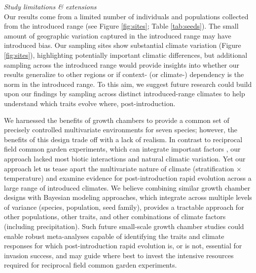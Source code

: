 \documentclass[11pt]{article}\usepackage[]{graphicx}\usepackage[]{color}
\begin{document}
\emph{Study limitations \& extensions}\\ 
Our results come from a limited number of individuals and populations collected from the introduced range (see Figure \ref{fig:sites}; Table \ref{tab:seeds}). The small amount of geographic variation captured in the introduced range may have introduced bias. Our sampling sites show substantial climate variation (Figure \ref{fig:sites}), highlighting potentially important climatic differences, but additional sampling across the introduced range would provide insights into whether our results generalize to other regions or if context- (or climate-) dependency is the norm in the introduced range. To this aim, we suggest future research could build upon our findings by sampling across distinct introduced-range climates to help understand which traits evolve where, post-introduction. %
	
	We harnessed the benefits of growth chambers to provide a common set of precisely controlled multivariate environments for seven species; however, the benefits of this design trade off with a lack of realism. In contrast to reciprocal field common garden experiments, which can integrate important factors \parencite{Germain2018,Blois2013}, our approach lacked most biotic interactions and natural climatic variation. Yet our approach let us tease apart the multivariate nature of climate (stratification $\times$ temperature) and examine evidence for post-introduction rapid evolution across a large range of introduced climates. We believe combining similar growth chamber designs with Bayesian modeling approaches, which integrate across multiple levels of variance (species, population, seed family), provides a tractable approach for other populations, other traits, and other combinations of climate factors (including precipitation). Such future small-scale growth chamber studies could enable robust meta-analyses capable of identifying the traits and climate responses for which post-introduction rapid evolution is, or is not, essential for invasion success, and may guide where best to invest the intensive resources required for reciprocal field common garden experiments. 
	
\end{document}
